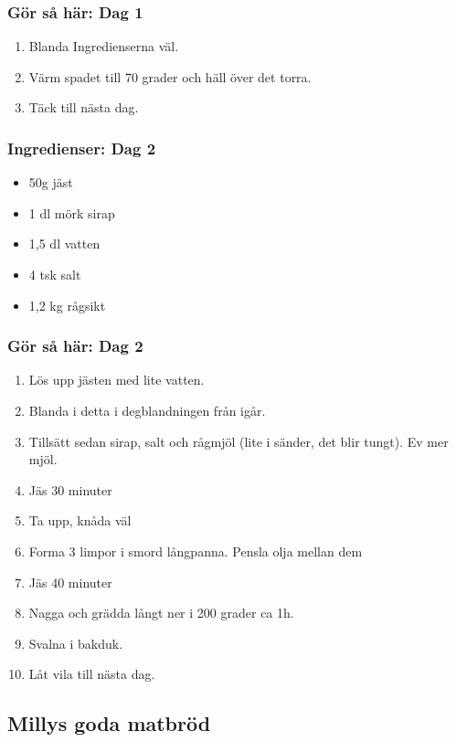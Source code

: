 \documentclass[a4paper,11pt,twocolumn]{article}
\begin{document}
\subsubsection*{Gör så här: Dag 1}
\begin{enumerate}[label=\arabic*.]
    \item Blanda Ingredienserna väl.
    \item Värm spadet till 70 grader och häll över det torra.
    \item Täck till nästa dag.
\end{enumerate}
\subsubsection*{Ingredienser: Dag 2}
\begin{itemize}[noitemsep]
    \item 50g jäst
    \item 1 dl mörk sirap
    \item 1,5 dl vatten
    \item 4 tsk salt
    \item 1,2 kg rågsikt
\end{itemize}
\subsubsection*{Gör så här: Dag 2}
\begin{enumerate}[label=\arabic*.]
    \item Lös upp jästen med lite vatten.
    \item Blanda i detta i degblandningen från igår.
    \item Tillsätt sedan sirap, salt och rågmjöl (lite i sänder, det blir tungt). Ev mer mjöl.
    \item Jäs 30 minuter
    \item Ta upp, knåda väl
    \item Forma 3 limpor i smord långpanna. Pensla olja mellan dem
    \item Jäs 40 minuter
    \item Nagga och grädda långt ner i 200 grader ca 1h.
    \item Svalna i bakduk.
    \item Låt vila till nästa dag.
\end{enumerate}


\subsection{Millys goda matbröd}
\end{document}
